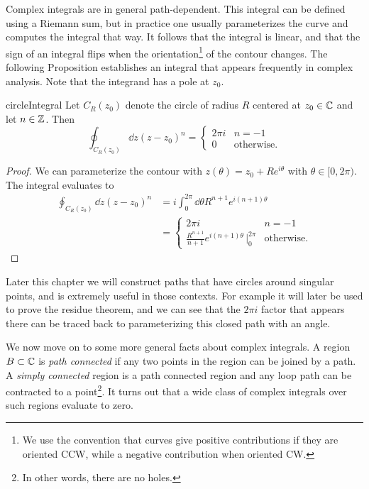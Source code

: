Complex integrals are in general path-dependent.
This integral can be defined using a Riemann sum, but in practice one usually
parameterizes the curve and computes the integral that way.
It follows that the integral is linear, and that the sign of an integral
flips when the orientation\footnote{We use the convention
that curves give positive contributions if they are oriented CCW, while a
negative contribution when oriented CW.} of the contour changes.
The following Proposition establishes an integral that appears frequently
in complex analysis. Note that the integrand has a pole at $z_0$.
\begin{proposition}{}{circleIntegral}
Let $C_R(z_0)$ denote the circle of radius $R$ centered at $z_0\in\mathbb{C}$
and let $n\in\mathbb{Z}$. Then
$$
\oint_{C_R(z_0)}\dd{z}(z-z_0)^n=
\begin{cases}
 2\pi i & n=-1\\
 0      & \text{otherwise}.
\end{cases}
$$
\begin{proof}
We can parameterize the contour with $z(\theta)=z_0+Re^{i\theta}$
with $\theta\in[0,2\pi)$. The integral evaluates to
\begin{equation*}\begin{aligned}
\oint_{C_R(z_0)}\dd{z}(z-z_0)^n&=
i\int_0^{2\pi}\dd{\theta} R^{n+1}e^{i(n+1)\theta}\\
&=
\begin{cases}
 2\pi i & n=-1\\
 \frac{R^{n+1}}{n+1}e^{i(n+1)\theta}\,\big|_0^{2\pi} & \text{otherwise}. 
\end{cases}
\end{aligned}\end{equation*}
\end{proof}
\end{proposition}

Later this chapter we will construct paths that have circles around singular
points, and  is extremely useful in those contexts.
For example it will later be used to prove the residue
theorem, and we can see that the $2\pi i$ factor that appears there can be traced
back to parameterizing this closed path with an angle.  

We now move on to some more general facts about complex integrals.
A region $B\subset\mathbb{C}$ is {\it path connected} if any two points in the region
can be joined by a path. A {\it simply connected} region is a path connected
region and any loop path can be contracted to a point\footnote{In other words,
there are no holes.}. It turns out that a wide class of complex integrals
over such regions evaluate to zero.

